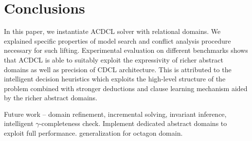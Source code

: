 \section{Conclusions}
In this paper, we instantiate ACDCL solver with relational domains.  We explained specific properties of model search and conflict analysis procedure necessary
for such lifting.  Experimental evaluation on different benchmarks shows that
ACDCL is able to suitably exploit the expressivity of richer
abstract domains as well as precision of CDCL architecture.
This is attributed to the intelligent decision heuristics
which exploits the high-level structure of the problem
combined with stronger deductions and clause learning
mechanism aided by the richer abstract domains.

Future work -- domain refinement, incremental solving, invariant inference, intelligent $\gamma$-completeness check. Implement dedicated abstract domains to exploit full performance.
generalization for octagon domain.
